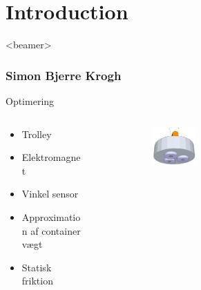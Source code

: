 \section{Introduction}
\begin{frame}<beamer>
\frametitle{Simon Bjerre Krogh}
\tableofcontents[currentsection]
\end{frame}


\begin{frame}{Optimering}{}

\begin{columns}[T]
\begin{column}{.35\textwidth}

  \begin{itemize}
    \item<1-> Trolley
    \vspace{0.8cm}
    \item<2-> Elektromagnet  
    \vspace{1.5cm}
    \item<3-> Vinkel sensor
    \vspace{1cm}
    \item<4-> Approximation af container vægt 
    \vspace{0.5cm}
    \item<5-> Statisk friktion
  \end{itemize}
\end{column}%
\hfill%
\begin{column}{.65\textwidth}

\begin{figure}[H]
  \centering
{}  \begin{subfigure}{0.98\textwidth}
        \centering
        \includegraphics[width=0.3\textwidth]{Billeder/Electromagnet.png}
        \end{subfigure}



\end{figure}
\end{column}
\end{columns}
\end{frame}
